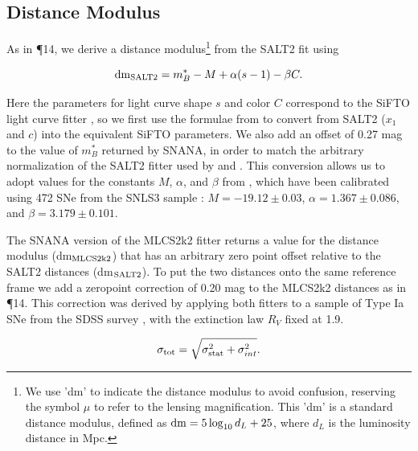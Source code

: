 \subsection{Distance Modulus}
\label{sec:DistanceModulus}

As in \P14, we derive a distance modulus\footnote{We use 'dm' to
indicate the distance modulus to avoid confusion, reserving the symbol
$\mu$ to refer to the lensing magnification. This 'dm' is a standard
distance modulus, defined as ${\rm dm}=5\log_{10}d_L+25$, where $d_L$
is the luminosity distance in Mpc.}  from the SALT2 fit using

\begin{equation} \label{eqn:dmSALT2}
 {\rm dm}_{\rm SALT2} = m_B^* - M + \alpha(s-1) - \beta C.
\end{equation}

\noindent  Here the parameters for light curve shape $s$ and color $C$ 
correspond to the SiFTO light curve fitter \citep{Conley:2008}, so we
first use the formulae from \citet{Guy:2010} to convert from SALT2
($x_1$ and $c$) into the equivalent SiFTO parameters.  We also add an
offset of 0.27 mag to the value of $m_B^*$ returned by SNANA, in order
to match the arbitrary normalization of the SALT2 fitter used
by \citet{Guy:2010} and \citet{Sullivan:2011}.  This conversion allows
us to adopt values for the constants $M$, $\alpha$, and $\beta$
from \citet{Sullivan:2011}, which have been calibrated using 472 SNe
from the SNLS3 sample \citep{Conley:2011}: $M=-19.12\pm0.03$,
$\alpha=1.367\pm0.086$, and $\beta=3.179\pm0.101$.



The SNANA version of the MLCS2k2 fitter returns a value for the
distance modulus (dm$_{\rm MLCS2k2}$) that has an arbitrary zero point
offset relative to the SALT2 distances (dm$_{\rm SALT2}$).  To put the
two distances onto the same reference frame we add a zeropoint
correction of 0.20 mag to the MLCS2k2 distances as
in \P14.  This correction was derived by applying both
fitters to a sample of Type Ia SNe from the SDSS
survey \citep{Holtzman:2008,Kessler:2009b}, with the extinction law
$R_V$ fixed at 1.9.


\begin{equation} \label{eqn:sigmatot}
 \sigma_{\rm tot} = \sqrt{ \sigma_{\rm stat}^2 + \sigma_{int}^2}.
\end{equation}

